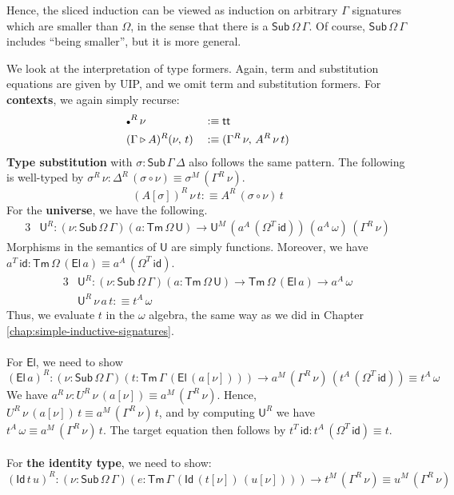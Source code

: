 \documentclass[12pt,a4paper,twoside,openany]{book}
\theoremstyle{remark}
\theoremstyle{definition}
\theoremstyle{theorem}
\newcommand{\id}{\mathsf{id}}
\newcommand{\Sub}{\mathsf{Sub}}
\newcommand{\Tm}{\mathsf{Tm}}
\newcommand{\U}{\mathsf{U}}
\newcommand{\El}{\mathsf{El}}
\newcommand{\Id}{\mathsf{Id}}
\renewcommand{\tt}{\mathsf{tt}}
\newcommand{\ext}{\triangleright}
\newcommand{\emptycon}{\scaleobj{.75}\bullet}
\newcommand{\defn}{:\equiv}
\begin{document}
Hence, the sliced induction can be viewed as induction on arbitrary $\Gamma$
signatures which are smaller than $\Omega$, in the sense that there is a
$\Sub\,\Omega\,\Gamma$. Of course, $\Sub\,\Omega\,\Gamma$ includes ``being
smaller'', but it is more general.

We look at the interpretation of type formers. Again, term and substitution
equations are given by UIP, and we omit term and substitution formers.  For
\textbf{contexts}, we again simply recurse:
\begin{alignat*}{3}
  &\emptycon^R\,\nu           &&\defn \tt\\
  &(\Gamma \ext A)^R(\nu,\,t) &&\defn (\Gamma^R\,\nu,\,A^R\,\nu\,t)
\end{alignat*}
\textbf{Type substitution} with $\sigma : \Sub\,\Gamma\,\Delta$ also follows
the same pattern. The following is well-typed by $\sigma^R\,\nu : \Delta^R\,(\sigma\circ\nu) \equiv \sigma^M\,(\Gamma^R\,\nu)$.
\[ (A[\sigma])^R\,\nu\,t \defn A^R\,(\sigma\circ\nu)\,t \]
For the \textbf{universe}, we have the following.
\begin{alignat*}{3}
  &\U^R : (\nu : \Sub\,\Omega\,\Gamma)(a : \Tm\,\Omega\,\U) \to \U^M\,(a^A\,(\Omega^T\,\id))\,(a^A\,\omega)\,(\Gamma^R\,\nu)
\end{alignat*}
Morphisms in the semantics of $\U$ are simply functions. Moreover, we have
$a^T\,\id : \Tm\,\Omega\,(\El\,a) \equiv a^A\,(\Omega^T\,\id)$.
\begin{alignat*}{3}
  &\U^R : (\nu : \Sub\,\Omega\,\Gamma)(a : \Tm\,\Omega\,\U) \to \Tm\,\Omega\,(\El\,a) \to a^A\,\omega\\
  &\U^R\,\nu\,a\,t \defn t^A\,\omega
\end{alignat*}
Thus, we evaluate $t$ in the $\omega$ algebra, the same way as we did in Chapter
\ref{chap:simple-inductive-signatures}.
\\\\
\noindent For \textbf{$\El$}, we need to show
\[
  (\El\,a)^R : (\nu : \Sub\,\Omega\,\Gamma)(t : \Tm\,\Gamma\,(\El\,(a[\nu]))) \to a^M\,(\Gamma^R\,\nu)\,(t^A\,(\Omega^T\,\id)) \equiv t^A\,\omega
\]
We have $a^R\,\nu : U^R\,\nu\,(a[\nu]) \equiv a^M\,(\Gamma^R\,\nu)$. Hence,
$U^R\,\nu\,(a[\nu])\,t \equiv a^M\,(\Gamma^R\,\nu)\,t$, and by computing $\U^R$
we have $t^A\,\omega \equiv a^M\,(\Gamma^R\,\nu)\,t$. The target equation then
follows by $t^T\,\id : t^A\,(\Omega^T\,\id) \equiv t$.
\\\\
\noindent For \textbf{the identity type}, we need to show:
\[
(\Id\,t\,u)^R : (\nu : \Sub\,\Omega\,\Gamma)(e : \Tm\,\Gamma\,(\Id\,(t[\nu])\,(u[\nu])))
  \to t^M\,(\Gamma^R\,\nu) \equiv u^M\,(\Gamma^R\,\nu)
  \]
\end{document}
